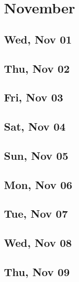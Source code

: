 \chapter{November}
	\section{Wed, Nov 01}
		
	\section{Thu, Nov 02}
		
	\section{Fri, Nov 03}
		
	\section{Sat, Nov 04}
		
	\section{Sun, Nov 05}
		
	\section{Mon, Nov 06}
		
	\section{Tue, Nov 07}
		
	\section{Wed, Nov 08}
		
	\section{Thu, Nov 09}
		

